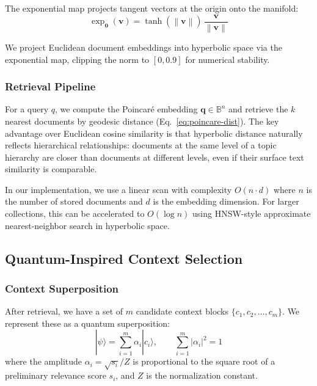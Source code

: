 \documentclass[11pt,a4paper]{article}
\newcommand{\B}{\mathbb{B}}
\newcommand{\norm}[1]{\left\|#1\right\|}
\newcommand{\ket}[1]{|#1\rangle}
\begin{document}
The exponential map projects tangent vectors at the origin onto the
manifold:
\begin{equation}
  \exp_{\mathbf{0}}(\mathbf{v}) = \tanh(\norm{\mathbf{v}})
  \,\frac{\mathbf{v}}{\norm{\mathbf{v}}}
\end{equation}

We project Euclidean document embeddings into hyperbolic space via the
exponential map, clipping the norm to $[0, 0.9]$ for numerical stability.

\subsubsection{Retrieval Pipeline}

For a query $q$, we compute the Poincar\'{e} embedding $\mathbf{q} \in
\B^n$ and retrieve the $k$ nearest documents by geodesic distance
(Eq.~\ref{eq:poincare-dist}).  The key advantage over Euclidean cosine
similarity is that hyperbolic distance naturally reflects hierarchical
relationships: documents at the same level of a topic hierarchy are closer
than documents at different levels, even if their surface text similarity is
comparable.

In our implementation, we use a linear scan with complexity $O(n \cdot d)$
where $n$ is the number of stored documents and $d$ is the embedding
dimension.  For larger collections, this can be accelerated to
$O(\log n)$ using HNSW-style approximate nearest-neighbor search in
hyperbolic space.

\subsection{Quantum-Inspired Context Selection}
\label{sec:quantum}

\subsubsection{Context Superposition}

After retrieval, we have a set of $m$ candidate context blocks
$\{c_1, c_2, \ldots, c_m\}$.  We represent these as a quantum
superposition:
\begin{equation}
  \ket{\psi} = \sum_{i=1}^{m} \alpha_i \ket{c_i}, \qquad
  \sum_{i=1}^{m} |\alpha_i|^2 = 1
\end{equation}
where the amplitude $\alpha_i = \sqrt{s_i} / Z$ is proportional to the
square root of a preliminary relevance score $s_i$, and $Z$ is the
normalization constant.
\end{document}
